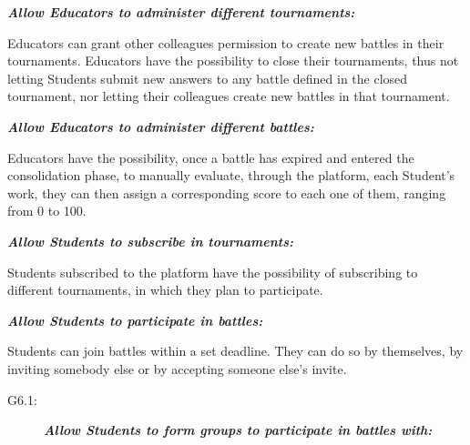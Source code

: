 \documentclass{article}
\begin{document}
\begin{description}
\begin{description}
          \end{description}
          \newpage
    \item[G3:] \textit{\textbf{Allow Educators to administer different tournaments:}}
          \begin{description}
              \item Educators can grant other colleagues permission to create new battles in their tournaments. 
              Educators have the possibility to close their tournaments, thus not letting Students submit new answers to any battle defined in the closed tournament,
              nor letting their colleagues create new battles in that tournament.
          \end{description}
    \item[G4:] \textit{\textbf{Allow Educators to administer different battles:}}
          \begin{description}
              \item Educators have the possibility, once a battle has expired and entered the consolidation phase, 
              to manually evaluate, through the platform, each Student's work, they can then assign a corresponding score to each one of them, ranging from 0 to 100.
          \end{description}
    \item[G5:] \textbf{\textit{Allow Students to subscribe in tournaments:}}
          \begin{description}
              \item Students subscribed to the platform have the possibility of subscribing to different tournaments, in which they plan to participate.
          \end{description}
    \item[G6:] \textbf{\textit{Allow Students to participate in battles:}}
          \begin{description}
              \item Students can join battles within a set deadline. They can do so by themselves, by inviting somebody else or by accepting someone else's invite.
                    \begin{description}
                        \item[G6.1:] \textbf{\textit{Allow Students to form groups to participate in battles with:}}
\end{description}
\end{description}
\end{description}
\end{document}
